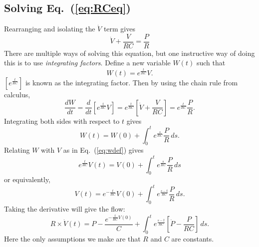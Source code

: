 \documentclass[10pt]{article}
\begin{document}
\subsection{Solving Eq.~(\ref{eq:RCeq})}
Rearranging and isolating the $\dot V$ term gives
\begin{equation}
\dot V + \frac{V}{RC} = \frac{P}{R}
\end{equation}
There are multiple ways of solving this equation, but one instructive way of doing this is to use \textit{integrating factors}. Define a new variable $W(t)$ such that 
\begin{equation} \label{eq:wdef}
W(t) = e^{\frac{t}{RC}}V. 
\end{equation}
$\left[e^{\frac{t}{RC}}\right]$ is known as the integrating factor. Then by using the chain rule from calculus,
\begin{equation}
\frac{dW}{dt} = \frac{d}{dt}\left[e^{\frac{t}{RC}}V\right] = e^{\frac{t}{RC}}\left[\dot V + \frac{V}{RC}\right] = e^{\frac{t}{RC}}\frac{P}{R}.
\end{equation}
Integrating both sides with respect to $t$ gives
\begin{equation}
W(t) = W(0) + \int_0^t e^{\frac{s}{RC}}\frac{P}{R}\,ds.
\end{equation}
Relating $W$ with $V$ as in Eq.~(\ref{eq:wdef}) gives
\begin{equation}
e^{\frac{t}{RC}}V(t) = V(0) + \int_0^t e^{\frac{s}{RC}}\frac{P}{R}\,ds
\end{equation}
or equivalently,
\begin{equation} \label{eq:volume}
\boxed{V(t) = e^{-\frac{t}{RC}}V(0) + \int_0^t e^{\frac{s-t}{RC}}\frac{P}{R}\,ds.}
\end{equation}
Taking the derivative will give the flow:
\begin{equation}
\boxed{R \times \dot V(t) = P - \frac{e^{-\frac{t}{RC}V(0)}}{C} + \int_0^t e^{\frac{s-t}{RC}}\left[\dot P - \frac{P}{RC}\right]\,ds.}
\end{equation}
Here the only assumptions we make are that $R$ and $C$ are constants. 
\end{document}
